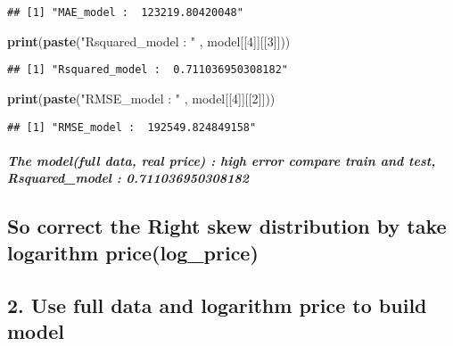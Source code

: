\documentclass[
]{article}
\newenvironment{Shaded}{\begin{snugshade}}{\end{snugshade}}
\newcommand{\DecValTok}[1]{\textcolor[rgb]{0.00,0.00,0.81}{#1}}
\newcommand{\FunctionTok}[1]{\textcolor[rgb]{0.13,0.29,0.53}{\textbf{#1}}}
\newcommand{\NormalTok}[1]{#1}
\newcommand{\StringTok}[1]{\textcolor[rgb]{0.31,0.60,0.02}{#1}}
\begin{document}
\begin{verbatim}
## [1] "MAE_model :  123219.80420048"
\end{verbatim}

\begin{Shaded}
\begin{Highlighting}[]
\FunctionTok{print}\NormalTok{(}\FunctionTok{paste}\NormalTok{(}\StringTok{"Rsquared\_model : "}\NormalTok{  , model[[}\DecValTok{4}\NormalTok{]][[}\DecValTok{3}\NormalTok{]]))}
\end{Highlighting}
\end{Shaded}

\begin{verbatim}
## [1] "Rsquared_model :  0.711036950308182"
\end{verbatim}

\begin{Shaded}
\begin{Highlighting}[]
\FunctionTok{print}\NormalTok{(}\FunctionTok{paste}\NormalTok{(}\StringTok{"RMSE\_model : "}\NormalTok{ ,      model[[}\DecValTok{4}\NormalTok{]][[}\DecValTok{2}\NormalTok{]]))}
\end{Highlighting}
\end{Shaded}

\begin{verbatim}
## [1] "RMSE_model :  192549.824849158"
\end{verbatim}

\hypertarget{the-modelfull-data-real-price-high-error-compare-train-and-test-rsquared_model-0.711036950308182}{%
\subparagraph{The model(full data, real price) : high error compare
train and test, Rsquared\_model :
0.711036950308182}\label{the-modelfull-data-real-price-high-error-compare-train-and-test-rsquared_model-0.711036950308182}}

\hypertarget{so-correct-the-right-skew-distribution-by-take-logarithm-pricelog_price}{%
\subsection{So correct the Right skew distribution by take logarithm
price(log\_price)}\label{so-correct-the-right-skew-distribution-by-take-logarithm-pricelog_price}}

\hypertarget{use-full-data-and-logarithm-price-to-build-model}{%
\subsection{2. Use full data and logarithm price to build
model}\label{use-full-data-and-logarithm-price-to-build-model}}
\end{document}

